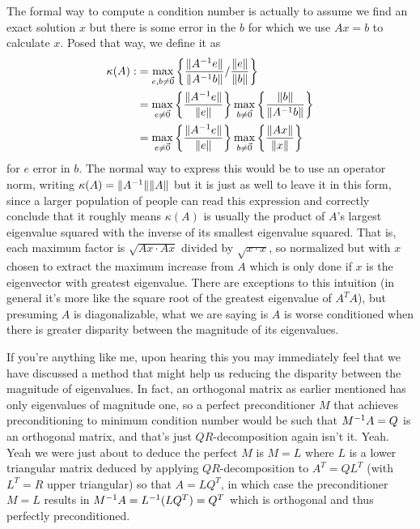 \documentclass[11pt]{article}
\begin{document}
The formal way to compute a condition number is actually to assume we find an exact solution $x$ but there is some error in the $b$ for which we use $Ax = b$ to calculate $x$. Posed that way, we define it as \begin{align*}
\kappa(A) :&= \max_{e,b \neq \vec 0} \left\{ \frac{\lVert A^{-1} e \rVert}{\lVert A^{-1} b \rVert} / \frac{\lVert e \rVert }{\lVert b \rVert} \right\} \\
&= \max_{e \neq \vec 0} \left\{ \frac{\lVert A^{-1} e \rVert}{\lVert e \rVert} \right\} \max_{b \neq \vec 0} \left\{ \frac{\lVert b \rVert }{\lVert A^{-1} b \rVert } \right\} \\
&= \max_{e \neq \vec 0} \left\{ \frac{\lVert A^{-1} e \rVert}{\lVert e \rVert} \right\} \max_{b \neq \vec 0} \left\{ \frac{\lVert A x \rVert }{\lVert x \rVert } \right\}
\end{align*}
for $e$ error in $b$. The normal way to express this would be to use an operator norm, writing $\kappa(A) = \lVert A^{-1} \rVert \lVert A \rVert$ but it is just as well to leave it in this form, since a larger population of people can read this expression and correctly conclude that it roughly means $\kappa(A)$ is usually the product of $A$'s largest eigenvalue squared with the inverse of its smallest eigenvalue squared. That is, each maximum factor is $\sqrt{Ax \cdot  A x}$ divided by $\sqrt{x \cdot x}$, so normalized but with $x$ chosen to extract the maximum increase from $A$ which is only done if $x$ is the eigenvector with greatest eigenvalue. There are exceptions to this intuition (in general it's more like the square root of the greatest eigenvalue of $A^T A$), but presuming $A$ is diagonalizable, what we are saying is $A$ is worse conditioned when there is greater disparity between the magnitude of its eigenvalues.

If you're anything like me, upon hearing this you may immediately feel that we have discussed a method that might help us reducing the disparity between the magnitude of eigenvalues. In fact, an orthogonal matrix as earlier mentioned has only eigenvalues of magnitude one, so a perfect preconditioner $M$ that achieves preconditioning to minimum condition number would be such that $M^{-1} A = Q$ is an orthogonal matrix, and that's just $QR$-decomposition again isn't it. Yeah. Yeah we were just about to deduce the perfect $M$ is $M=L$ where $L$ is a lower triangular matrix deduced by applying $QR$-decomposition to $A^T = QL^T$ (with $L^T=R$ upper triangular) so that $A = L Q^T$, in which case the preconditioner $M = L$ results in $M^{-1} A = L^{-1} (LQ^T) = Q^T$ which is orthogonal and thus perfectly preconditioned.
\end{document}

